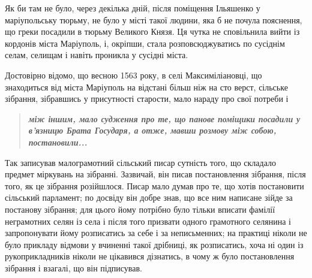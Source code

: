 \documentclass[a4paper,20pt]{report}
\begin{document}
Як би там не було, через декілька дній, після поміщення Ільяшенко у маріупольську тюрьму,
не було у місті такої людини, яка б не почула пояснення, що греки посадили в тюрьму Великого Князя.
Ця чутка не сповільнила вийти із кордонів міста Маріуполь, і, окріпши, стала розповсюджуватись по 
сусіднім селам, селищам і навіть проникла у сусідні міста.

Достовірно відомо, що весною 1563 року, в селі Максиміліановці, що знаходиться від міста Маріуполь 
на відстані більш ніж на сто верст, сільське зібрання, зібравшись у присутності старости, мало нараду 
про свої потреби і
\begin{quote}
\em\bfseries
між іншим, мало судження про те, що панове поміщики посадили у в'язницю Брата Государя,
а отже, мавши розмову між собою, постановили...
\end{quote}
Так записував малограмотний сільський писар сутність того, що складало
предмет міркувань на зібранні. Зазвичай, він писав постановлення зібрання,
після того, як це зібрання розійшлося. Писар мало думав про те, що хотів постановити
сільський парламент; по досвіду він добре знав, що все ним написане зійде за постанову зібрання;
для цього йому потрібно було тільки вписати фамілії неграмотних селян із села і після того призвати одного
грамотного селянина і запропонувати йому розписатись за себе і за неписьменних; на практиці ніколи не 
було прикладу відмови у вчиненні такої дрібниці, як розписатись, хоча ні один із рукоприкладників
ніколи не цікавився дізнатись, в чому ж було постановлення зібрання і взагалі, що він підписував.
\end{document}
